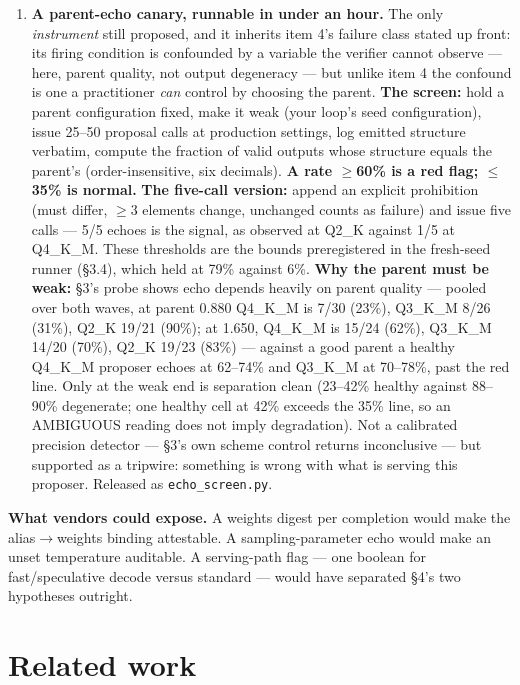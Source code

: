 \begin{enumerate}
\item \textbf{A parent-echo canary, runnable in under an hour.} The only \emph{instrument} still proposed, and it inherits item 4's failure class stated up front: its firing condition is confounded by a variable the verifier cannot observe --- here, parent quality, not output degeneracy --- but unlike item 4 the confound is one a practitioner \emph{can} control by choosing the parent. \textbf{The screen:} hold a parent configuration fixed, make it weak (your loop's seed configuration), issue 25--50 proposal calls at production settings, log emitted structure verbatim, compute the fraction of valid outputs whose structure equals the parent's (order-insensitive, six decimals). \textbf{A rate $\ge$60\% is a red flag; $\le$35\% is normal.} \textbf{The five-call version:} append an explicit prohibition (must differ, $\ge$3 elements change, unchanged counts as failure) and issue five calls --- 5/5 echoes is the signal, as observed at Q2\_K against 1/5 at Q4\_K\_M. These thresholds are the bounds preregistered in the fresh-seed runner (\S3.4), which held at 79\% against 6\%. \textbf{Why the parent must be weak:} \S3's probe shows echo depends heavily on parent quality --- pooled over both waves, at parent 0.880 Q4\_K\_M is 7/30 (23\%), Q3\_K\_M 8/26 (31\%), Q2\_K 19/21 (90\%); at 1.650, Q4\_K\_M is 15/24 (62\%), Q3\_K\_M 14/20 (70\%), Q2\_K 19/23 (83\%) --- against a good parent a healthy Q4\_K\_M proposer echoes at 62--74\% and Q3\_K\_M at 70--78\%, past the red line. Only at the weak end is separation clean (23--42\% healthy against 88--90\% degenerate; one healthy cell at 42\% exceeds the 35\% line, so an AMBIGUOUS reading does not imply degradation). Not a calibrated precision detector --- \S3's own scheme control returns inconclusive --- but supported as a tripwire: something is wrong with what is serving this proposer. Released as \texttt{echo\_screen.py}.
\end{enumerate}

\textbf{What vendors could expose.} A weights digest per completion would make the alias$\to$weights binding attestable. A sampling-parameter echo would make an unset temperature auditable. A serving-path flag --- one boolean for fast/speculative decode versus standard --- would have separated \S4's two hypotheses outright.

\section{Related work}

